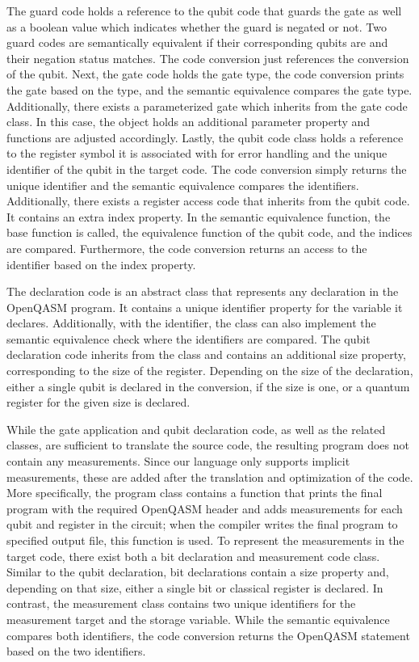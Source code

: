 The guard code holds a reference to the qubit code that guards the gate as well as a boolean value which indicates whether the guard is negated or not. Two guard codes are semantically equivalent if their corresponding qubits are and their negation status matches. The code conversion just references the conversion of the qubit.
Next, the gate code holds the gate type, the code conversion prints the gate based on the type, and the semantic equivalence compares the gate type. Additionally, there exists a parameterized gate which inherits from the gate code class. In this case, the object holds an additional parameter property and functions are adjusted accordingly. Lastly, the qubit code class holds a reference to the register symbol it is associated with for error handling and the unique identifier of the qubit in the target code. The code conversion simply returns the unique identifier and the semantic equivalence compares the identifiers. Additionally, there exists a register access code that inherits from the qubit code. It contains an extra index property. In the semantic equivalence function, the base function is called, \ie the equivalence function of the qubit code, and the indices are compared. Furthermore, the code conversion returns an access to the identifier based on the index property. 

The declaration code is an abstract class that represents any declaration in the OpenQASM program. It contains a unique identifier property for the variable it declares. Additionally, with the identifier, the class can also implement the semantic equivalence check where the identifiers are compared. The qubit declaration code inherits from the class and contains an additional size property, corresponding to the size of the register. Depending on the size of the declaration, either a single qubit is declared in the conversion, if the size is one, or a quantum register for the given size is declared. 

While the gate application and qubit declaration code, as well as the related classes, are sufficient to translate the source code, the resulting program does not contain any measurements. Since our language only supports implicit measurements, these are added after the translation and optimization of the code. More specifically, the program class contains a function that prints the final program with the required OpenQASM header and adds measurements for each qubit and register in the circuit; when the compiler writes the final program to specified output file, this function is used. 
To represent the measurements in the target code, there exist both a bit declaration and measurement code class. Similar to the qubit declaration, bit declarations contain a size property and, depending on that size, either a single bit or classical register is declared. In contrast, the measurement class contains two unique identifiers for the measurement target and the storage variable. While the semantic equivalence compares both identifiers, the code conversion returns the OpenQASM statement based on the two identifiers.

